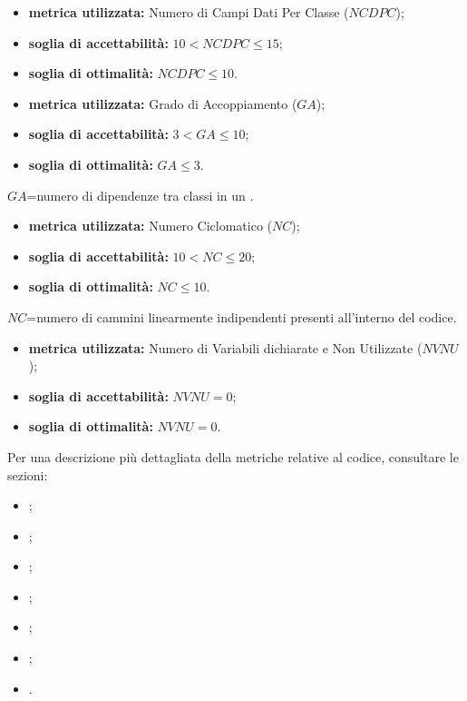\medskip

\begin{itemize}
	\item \textbf{metrica utilizzata:} Numero di Campi Dati Per Classe ($NCDPC$);
	\item \textbf{soglia di accettabilità:} $10<NCDPC\leq 15$;
	\item \textbf{soglia di ottimalità:} $NCDPC\leq10$.
\end{itemize}	

\medskip

\begin{itemize}
	\item \textbf{metrica utilizzata:} Grado di Accoppiamento ($GA$);
	\item \textbf{soglia di accettabilità:} $3<GA \leq 10$;
	\item \textbf{soglia di ottimalità:} $GA\leq3$.
\end{itemize}	
$GA$=numero di dipendenze tra classi in un .

\bigskip

\begin{itemize}
	\item \textbf{metrica utilizzata:} Numero Ciclomatico ($NC$);
	\item \textbf{soglia di accettabilità:} $10<NC\leq20$;
	\item \textbf{soglia di ottimalità:} $NC\leq10$.
\end{itemize}	
$NC$=numero di cammini linearmente indipendenti presenti all'interno del codice.

\bigskip

\begin{itemize}
	\item \textbf{metrica utilizzata:} Numero di Variabili dichiarate e Non Utilizzate ($NVNU$);
	\item \textbf{soglia di accettabilità:} $NVNU=0$;
	\item \textbf{soglia di ottimalità:} $NVNU=0$.
\end{itemize}


\bigskip

Per una descrizione più dettagliata della metriche relative al codice, consultare le sezioni:
\begin{itemize}
	\item {};
	\item {};
	\item {};
	\item {};
	\item {};
	\item {};
	\item {}.
\end{itemize}

